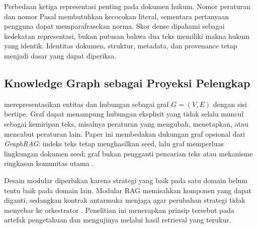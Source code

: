 Perbedaan ketiga representasi penting pada dokumen hukum. Nomor peraturan dan nomor Pasal membutuhkan kecocokan literal, sementara pertanyaan pengguna dapat memparafrasekan norma. Skor dense dipahami sebagai kedekatan representasi, bukan putusan bahwa dua teks memiliki makna hukum yang identik. Identitas dokumen, struktur, metadata, dan provenance tetap menjadi dasar yang dapat diperiksa.

\subsection{Knowledge Graph sebagai Proyeksi Pelengkap}

\kg merepresentasikan entitas dan hubungan sebagai graf $G=(V,E)$ dengan sisi bertipe. Graf dapat menampung hubungan eksplisit yang tidak selalu muncul sebagai kemiripan teks, misalnya peraturan yang mengubah, menetapkan, atau mencabut peraturan lain. Paper ini membedakan dukungan graf opsional dari \textit{GraphRAG}: indeks teks tetap menghasilkan seed, lalu graf memperluas lingkungan dokumen seed; graf bukan pengganti pencarian teks atau mekanisme ringkasan komunitas utama \cite{edgeFromLocalGlobalGraph2024,hanRetrievalAugmentedGenerationGraphs2025}.

Desain modular diperlukan karena strategi yang baik pada satu domain belum tentu baik pada domain lain. Modular RAG memisahkan komponen yang dapat diganti, sedangkan kontrak antarmuka menjaga agar perubahan strategi tidak menyebar ke orkestrator \cite{gaoModularRAG2024,garlanIntroductionSoftware1994}. Penelitian ini menerapkan prinsip tersebut pada artefak pengetahuan dan mengujinya melalui hasil retrieval yang terukur.

